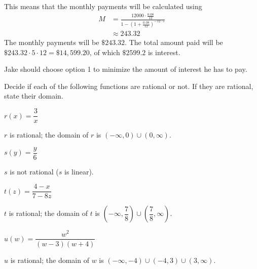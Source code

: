 \begin{problem}
\begin{subproblem}
\begin{shortsolution}
\begin{description}
			This means that the monthly payments will be calculated using
			\begin{align*}
				M & = \frac{12000\cdot \frac{0.08}{12}}{1-\left( 1+\frac{0.08}{12} \right)^{-12\cdot 5}} \\
				  & \approx 243.32
			\end{align*}
			The monthly payments will be $\$243.32$. The total amount paid
			will be $\$243.32\cdot 5\cdot 12 =\$14,599.20$, of which $\$2599.2$ is
			interest.
		\end{description}
		Jake should choose option 1 to minimize the amount of interest
		he has to pay.
	\end{shortsolution}
\end{subproblem}
\end{problem}

\begin{exercises}
\begin{problem}
Decide if each of the following functions are rational or not. If
they are rational, state their domain.
\begin{multicols}{3}
	\begin{subproblem}
		$r(x)=\dfrac{3}{x}$
		\begin{shortsolution}
			$r$ is rational; the domain of $r$ is $(-\infty,0)\cup (0,\infty)$.
		\end{shortsolution}
	\end{subproblem}
	\begin{subproblem}
		$s(y)=\dfrac{y}{6}$
		\begin{shortsolution}
			$s$ is not rational ($s$ is linear).
		\end{shortsolution}
	\end{subproblem}
	\begin{subproblem}
		$t(z)=\dfrac{4-x}{7-8z}$
		\begin{shortsolution}
			$t$ is rational; the domain of $t$ is $\left( -\infty,\dfrac{7}{8} \right)\cup \left( \dfrac{7}{8},\infty \right)$.
		\end{shortsolution}
	\end{subproblem}
	\begin{subproblem}
		$u(w)=\dfrac{w^2}{(w-3)(w+4)}$
		\begin{shortsolution}
			$u$ is rational; the domain of $w$ is $(-\infty,-4)\cup(-4,3)\cup(3,\infty)$.
		\end{shortsolution}
	\end{subproblem}

\end{multicols}
\end{problem}
\end{exercises}
